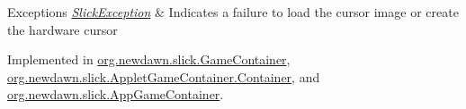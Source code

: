 \begin{DoxyExceptions}{Exceptions}
{\em \mbox{\hyperlink{classorg_1_1newdawn_1_1slick_1_1_slick_exception}{Slick\+Exception}}} & Indicates a failure to load the cursor image or create the hardware cursor \\
\hline
\end{DoxyExceptions}


Implemented in \mbox{\hyperlink{classorg_1_1newdawn_1_1slick_1_1_game_container_a1a61ebf50939e4ec362426ee041b5d8a}{org.\+newdawn.\+slick.\+Game\+Container}}, \mbox{\hyperlink{classorg_1_1newdawn_1_1slick_1_1_applet_game_container_1_1_container_a94e9af2ee3d8b55e8d5a425ffb33207e}{org.\+newdawn.\+slick.\+Applet\+Game\+Container.\+Container}}, and \mbox{\hyperlink{classorg_1_1newdawn_1_1slick_1_1_app_game_container_a70afe6f383739a5607c145a9fd193c26}{org.\+newdawn.\+slick.\+App\+Game\+Container}}.

